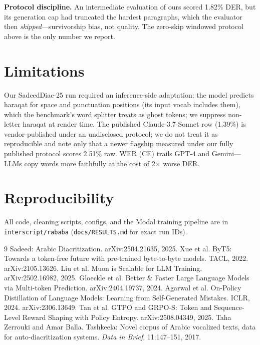 \documentclass[11pt]{article}
\begin{document}
\textbf{Protocol discipline.} An intermediate evaluation of ours
scored 1.82\% DER, but its generation cap had truncated the hardest
paragraphs, which the evaluator then \emph{skipped}---survivorship
bias, not quality. The zero-skip windowed protocol above is the only
number we report.

\section{Limitations}
Our SadeedDiac-25 run required an inference-side adaptation: the model
predicts haraqat for space and punctuation positions (its input vocab
includes them), which the benchmark's word splitter treats as ghost
tokens; we suppress non-letter haraqat at render time. The published
Claude-3.7-Sonnet row (1.39\%) is vendor-published under an
undisclosed protocol; we do not treat it as reproducible and note only
that a newer flagship measured under our fully published protocol
scores 2.51\% raw. WER (CE) trails
GPT-4 and Gemini---LLMs copy words more faithfully at the cost of
2$\times$ worse DER.

\section{Reproducibility}
All code, cleaning scripts, configs, and the Modal training pipeline are
in \texttt{interscript/rababa} (\texttt{docs/RESULTS.md} for exact run
IDs).

\begin{thebibliography}{9}
 Sadeed: Arabic Diacritization. arXiv:2504.21635, 2025.
 Xue et al. ByT5: Towards a token-free future with pre-trained byte-to-byte models. TACL, 2022. arXiv:2105.13626.
 Liu et al. Muon is Scalable for LLM Training. arXiv:2502.16982, 2025.
 Gloeckle et al. Better \& Faster Large Language Models via Multi-token Prediction. arXiv:2404.19737, 2024.
 Agarwal et al. On-Policy Distillation of Language Models: Learning from Self-Generated Mistakes. ICLR, 2024. arXiv:2306.13649.
 Tan et al. GTPO and GRPO-S: Token and Sequence-Level Reward Shaping with Policy Entropy. arXiv:2508.04349, 2025.
 Taha Zerrouki and Amar Balla. Tashkeela: Novel corpus of Arabic vocalized texts, data for auto-diacritization systems. \emph{Data in Brief}, 11:147--151, 2017.
\end{thebibliography}
\end{document}
